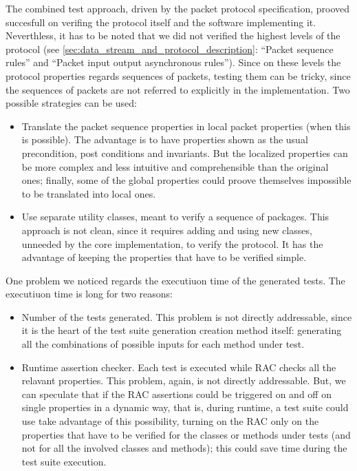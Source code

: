 \documentclass{article} \usepackage{times}
\begin{document}
The combined test approach, driven by the packet protocol
specification, prooved succesfull on verifing the protocol itself and
the software implementing it.  Neverthless, it has to be noted that we
did not verified the highest levels of the protocol (see
\ref{sec:data_stream_and_protocol_description}: ``Packet sequence
rules'' and ``Packet input output asynchronous rules'').  Since on
these levels the protocol properties regards sequences of packets,
testing them can be tricky, since the sequences of packets are not
referred to explicitly in the implementation.  Two possible strategies
can be used:

\begin{itemize}
\item Translate the packet sequence properties in local packet
  properties (when this is possible).  The advantage is to have
  properties shown as the usual precondition, post conditions and
  invariants.  But the localized properties can be more complex and
  less intuitive and comprehensible than the original ones; finally,
  some of the global properties could proove themselves impossible to
  be translated into local ones.
\item Use separate utility classes, meant to verify a sequence of
  packages.  This approach is not clean, since it requires adding and
  using new classes, unneeded by the core implementation, to verify
  the protocol.  It has the advantage of keeping the properties that
  have to be verified simple.
\end{itemize}

One problem we noticed regards the executiuon time of the generated
tests.  The executiuon time is long for two reasons:

\begin{itemize}
\item Number of the tests generated. This problem is not directly
  addressable, since it is the heart of the test suite generation
  creation method itself: generating all the combinations of possible
  inputs for each method under test.
\item Runtime assertion checker. Each test is executed while RAC
  checks all the relavant properties. This problem, again, is not
  directly addressable. But, we can speculate that if the RAC
  assertions could be triggered on and off on single properties in a
  dynamic way, that is, during runtime, a test suite could use take
  advantage of this possibility, turning on the RAC only on the
  properties that have to be verified for the classes or methods under
  tests (and not for all the involved classes and methods); this could
  save time during the test suite execution.
\end{itemize}
\end{document}

